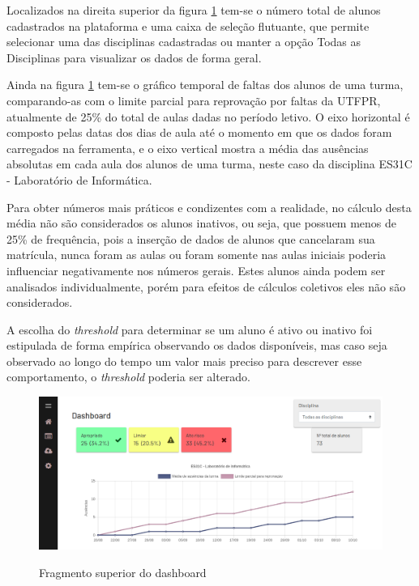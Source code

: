 Localizados na direita superior da figura \ref{fig:dashboard-1} tem-se o número total de alunos cadastrados na plataforma e uma caixa de seleção flutuante, que permite selecionar uma das disciplinas cadastradas ou manter a opção Todas as Disciplinas para visualizar os dados de forma geral.

Ainda na figura \ref{fig:dashboard-1} tem-se o gráfico temporal de faltas dos alunos de uma turma, comparando-as com o limite parcial para reprovação por faltas da UTFPR, atualmente de 25\% do total de aulas dadas no período letivo.
O eixo horizontal é composto pelas datas dos dias de aula até o momento em que os dados foram carregados na ferramenta, e o eixo vertical mostra a média das ausências absolutas em cada aula dos alunos de uma turma, neste caso da disciplina ES31C - Laboratório de Informática.

Para obter números mais práticos e condizentes com a realidade, no cálculo desta média não são considerados os alunos inativos, ou seja, que possuem menos de 25\% de frequência, pois a inserção de dados de alunos que cancelaram sua matrícula, nunca foram as aulas ou foram somente nas aulas iniciais poderia influenciar negativamente nos números gerais. 
Estes alunos ainda podem ser analisados individualmente, porém para efeitos de cálculos coletivos eles não são considerados.

A escolha do \textit{threshold} para determinar se um aluno é ativo ou inativo foi estipulada de forma empírica observando os dados disponíveis, mas caso seja observado ao longo do tempo um valor mais preciso para descrever esse comportamento, o \textit{threshold} poderia ser alterado.

\begin{figure}[!htb]
    \centering
    \caption{Fragmento superior do dashboard}
    \includegraphics[width=1\textwidth]{./dados/figuras/sistema/sistema-dashboard-1}
    \label{fig:dashboard-1}
\end{figure}

